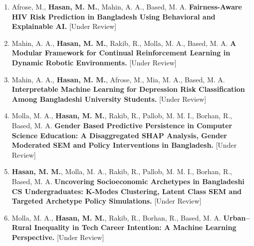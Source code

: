 \documentclass[a4paper,11pt]{article}
\begin{document}
\begin{enumerate}[leftmargin=1.5em, itemsep=6pt, topsep=0pt, resume]
\item Afrose, M., \textbf{Hasan, M. M.}, Mahin, A. A., Based, M. A.
\textbf{Fairness-Aware HIV Risk Prediction in Bangladesh Using Behavioral and Explainable AI.}
[Under Review]

\item Mahin, A. A., \textbf{Hasan, M. M.}, Rakib, R., Molla, M. A., Based, M. A.
\textbf{A Modular Framework for Continual Reinforcement Learning in Dynamic Robotic Environments.}
[Under Review]

\item Mahin, A. A., \textbf{Hasan, M. M.}, Afrose, M., Mia, M. A., Based, M. A.
\textbf{Interpretable Machine Learning for Depression Risk Classification Among Bangladeshi University Students.}
[Under Review]

\item Molla, M. A., \textbf{Hasan, M. M.}, Rakib, R., Pallob, M. M. I., Borhan, R., Based, M. A.
\textbf{Gender Based Predictive Persistence in Computer Science Education: A Disaggregated SHAP Analysis, Gender Moderated SEM and Policy Interventions in Bangladesh.}
[Under Review]

\item \textbf{Hasan, M. M.}, Molla, M. A., Rakib, R., Pallob, M. M. I., Borhan, R., Based, M. A.
\textbf{Uncovering Socioeconomic Archetypes in Bangladeshi CS Undergraduates: K-Modes Clustering, Latent Class SEM and Targeted Archetype Policy Simulations.}
[Under Review]

\item Molla, M. A., \textbf{Hasan, M. M.}, Rakib, R., Borhan, R., Based, M. A.
\textbf{Urban--Rural Inequality in Tech Career Intention: A Machine Learning Perspective.}
[Under Review]

\end{enumerate}
\end{document}
